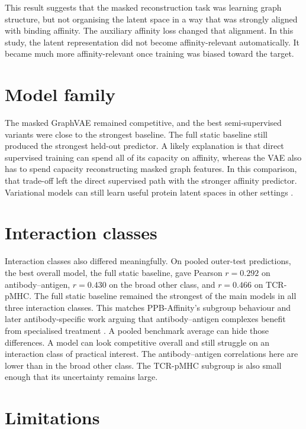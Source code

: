 This result suggests that the masked reconstruction task was learning graph structure, but not organising the latent space in a way that was strongly aligned with binding affinity. The auxiliary affinity loss changed that alignment. In this study, the latent representation did not become affinity-relevant automatically. It became much more affinity-relevant once training was biased toward the target.

\section{Model family}

The masked GraphVAE remained competitive, and the best semi-supervised variants were close to the strongest baseline. The full static baseline still produced the strongest held-out predictor. A likely explanation is that direct supervised training can spend all of its capacity on affinity, whereas the VAE also has to spend capacity reconstructing masked graph features. In this comparison, that trade-off left the direct supervised path with the stronger affinity predictor. Variational models can still learn useful protein latent spaces in other settings \citep{Kingma2014VAE,Kipf2016VGAE,Tian2021ProteinVAE}.

\section{Interaction classes}

Interaction classes also differed meaningfully. On pooled outer-test predictions, the best overall model, the full static baseline, gave Pearson $r=0.292$ on antibody--antigen, $r=0.430$ on the broad other class, and $r=0.466$ on TCR-pMHC. The full static baseline remained the strongest of the main models in all three interaction classes. This matches PPB-Affinity's subgroup behaviour and later antibody-specific work arguing that antibody--antigen complexes benefit from specialised treatment \citep{Liu2024PPBAffinity,Yang2023AntibodyAffinity}. A pooled benchmark average can hide those differences. A model can look competitive overall and still struggle on an interaction class of practical interest. The antibody--antigen correlations here are lower than in the broad other class. The TCR-pMHC subgroup is also small enough that its uncertainty remains large.

\section{Limitations}

